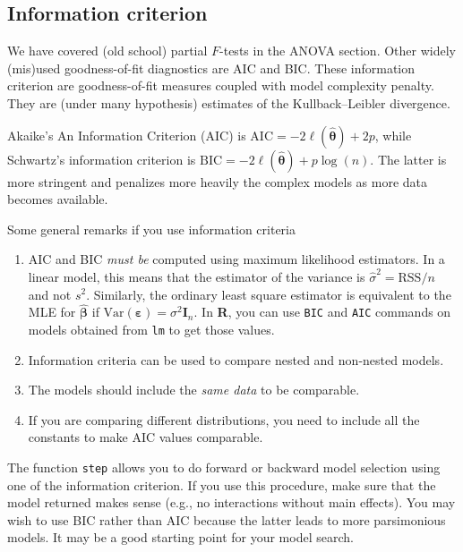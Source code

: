 \documentclass[]{book}
\providecommand{\tightlist}{%
  \setlength{\itemsep}{0pt}\setlength{\parskip}{0pt}}
\theoremstyle{definition}
\theoremstyle{definition}
\theoremstyle{definition}
\theoremstyle{remark}
\begin{document}
\hypertarget{information-criterion}{%
\subsection{Information criterion}\label{information-criterion}}

We have covered (old school) partial \(F\)-tests in the ANOVA section. Other widely (mis)used goodness-of-fit diagnostics are AIC and BIC. These information criterion are goodness-of-fit measures coupled with model complexity penalty. They are (under many hypothesis) estimates of the Kullback--Leibler divergence.

Akaike's An Information Criterion (AIC) is \(\mathrm{AIC}=-2\ell(\hat{\boldsymbol{\theta}}) + 2p\), while Schwartz's information criterion is \(\mathrm{BIC}=-2\ell(\hat{\boldsymbol{\theta}}) + p \log(n)\). The latter is more stringent and penalizes more heavily the complex models as more data becomes available.

Some general remarks if you use information criteria

\begin{enumerate}
\def\labelenumi{\arabic{enumi}.}
\tightlist
\item
  AIC and BIC \emph{must be} computed using maximum likelihood estimators. In a linear model, this means that the estimator of the variance is \(\hat{\sigma}^2=\mathrm{RSS}/n\) and not \(s^2\). Similarly, the ordinary least square estimator is equivalent to the MLE for \(\hat{\boldsymbol{\beta}}\) if \(\mathrm{Var}({\boldsymbol{\varepsilon}}) = \sigma^2 \mathbf{I}_n\). In \textbf{R}, you can use \texttt{BIC} and \texttt{AIC} commands on models obtained from \texttt{lm} to get those values.
\item
  Information criteria can be used to compare nested and non-nested models.
\item
  The models should include the \emph{same data} to be comparable.
\item
  If you are comparing different distributions, you need to include all the constants to make AIC values comparable.
\end{enumerate}

The function \texttt{step} allows you to do forward or backward model selection using one of the information criterion. If you use this procedure, make sure that the model returned makes sense (e.g., no interactions without main effects). You may wish to use BIC rather than AIC because the latter leads to more parsimonious models. It may be a good starting point for your model search.
\end{document}
